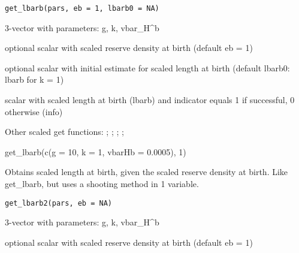 \documentclass[a4paper]{book}
\begin{document}
%
\begin{Usage}
\begin{verbatim}
get_lbarb(pars, eb = 1, lbarb0 = NA)
\end{verbatim}
\end{Usage}
%
\begin{Arguments}
\begin{ldescription}
\item[\code{pars}] 3-vector with parameters: g, k, vbar\_H\textasciicircum{}b

\item[\code{eb}] optional scalar with scaled reserve density at birth (default eb = 1)

\item[\code{lbarb0}] optional scalar with initial estimate for scaled length at birth (default lbarb0: lbarb for k = 1)
\end{ldescription}
\end{Arguments}
%
\begin{Value}
scalar with scaled length at birth (lbarb) and indicator equals 1 if successful, 0 otherwise (info)
\end{Value}
%
\begin{SeeAlso}\relax
Other scaled get functions: ;
; ;
;
\end{SeeAlso}
%
\begin{Examples}
\begin{ExampleCode}
get_lbarb(c(g = 10, k = 1, vbarHb = 0.0005), 1)
\end{ExampleCode}
\end{Examples}
%
\begin{Description}\relax
Obtains scaled length at birth, given the scaled reserve density at birth. Like get\_lbarb, but uses a shooting method in 1 variable.
\end{Description}
%
\begin{Usage}
\begin{verbatim}
get_lbarb2(pars, eb = NA)
\end{verbatim}
\end{Usage}
%
\begin{Arguments}
\begin{ldescription}
\item[\code{pars}] 3-vector with parameters: g, k, vbar\_H\textasciicircum{}b

\item[\code{eb}] optional scalar with scaled reserve density at birth (default eb = 1)
\end{ldescription}
\end{Arguments}
\end{document}
